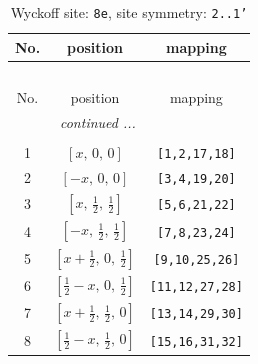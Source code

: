 \documentclass[fleqn,8pt]{jsarticle}
\begin{document}
\renewcommand{\arraystretch}{1.2}
\begin{longtable}{ccc}
\caption{Wyckoff site: {\tt 8e}, site symmetry: {\tt 2..1'}}
 \\
 \hline \hline
No. & position & mapping \\ \hline \endfirsthead

\multicolumn{2}{l}{\tablename\ \thetable{}} \\
 \hline \hline
No. & position & mapping \\ \hline \endhead

 \hline \hline
\multicolumn{2}{r}{\footnotesize\it continued ...} \\ \endfoot

 \hline \hline
\multicolumn{2}{r}{} \\ \endlastfoot

1 & $\left[ x,\, 0,\, 0 \right]$ & {\tt [1,2,17,18]} \\ \hline
2 & $\left[ - x,\, 0,\, 0 \right]$ & {\tt [3,4,19,20]} \\ \hline
3 & $\left[ x,\, \frac{1}{2},\, \frac{1}{2} \right]$ & {\tt [5,6,21,22]} \\ \hline
4 & $\left[ - x,\, \frac{1}{2},\, \frac{1}{2} \right]$ & {\tt [7,8,23,24]} \\ \hline
5 & $\left[ x + \frac{1}{2},\, 0,\, \frac{1}{2} \right]$ & {\tt [9,10,25,26]} \\ \hline
6 & $\left[ \frac{1}{2} - x,\, 0,\, \frac{1}{2} \right]$ & {\tt [11,12,27,28]} \\ \hline
7 & $\left[ x + \frac{1}{2},\, \frac{1}{2},\, 0 \right]$ & {\tt [13,14,29,30]} \\ \hline
8 & $\left[ \frac{1}{2} - x,\, \frac{1}{2},\, 0 \right]$ & {\tt [15,16,31,32]} \\
\end{longtable}
\renewcommand{\arraystretch}{1.2}
\end{document}
